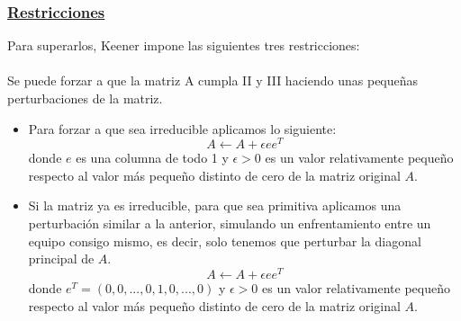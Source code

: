 \subsubsection*{\underline{Restricciones}}
Para superarlos, Keener impone las siguientes tres restricciones:\\
\ \\
Se puede forzar a que la matriz A cumpla II y III haciendo unas pequeñas perturbaciones de la matriz.
\begin{itemize}
	\item Para forzar a que sea irreducible aplicamos lo siguiente:
	\begin{equation*}
	A \leftarrow A + \epsilon e e^{T}
	\end{equation*}
	donde $e$ es una columna de todo 1 y $\epsilon>0$ es un valor relativamente pequeño respecto al valor más pequeño distinto de cero de la matriz original $A$.\\ 
	\item Si la matriz ya es irreducible, para que sea primitiva aplicamos una perturbación similar a la anterior, simulando un enfrentamiento entre un equipo consigo mismo, es decir, solo tenemos que perturbar la diagonal principal de $A$.
	\begin{equation*}
	A \leftarrow A + \epsilon e e^{T}
	\end{equation*}
	donde $e^{T} = \left( 0,0,...,0,1,0,...,0 \right) $ y $\epsilon>0$ es un valor relativamente pequeño respecto al valor más pequeño distinto de cero de la matriz original $A$.\\
\end{itemize}


